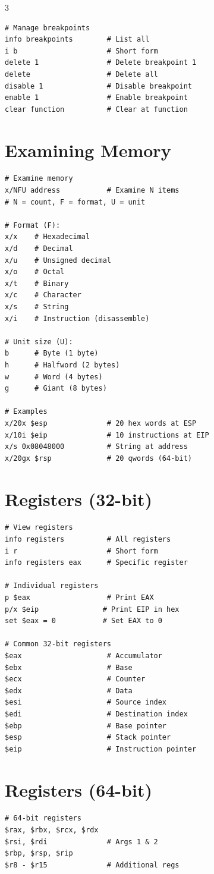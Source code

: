 \documentclass[10pt,landscape,a4paper]{article}
\begin{document}
\begin{multicols}{3}
\begin{lstlisting}
# Manage breakpoints
info breakpoints        # List all
i b                     # Short form
delete 1                # Delete breakpoint 1
delete                  # Delete all
disable 1               # Disable breakpoint
enable 1                # Enable breakpoint
clear function          # Clear at function
\end{lstlisting}

\section*{Examining Memory}
\begin{lstlisting}
# Examine memory
x/NFU address           # Examine N items
# N = count, F = format, U = unit

# Format (F):
x/x    # Hexadecimal
x/d    # Decimal
x/u    # Unsigned decimal
x/o    # Octal
x/t    # Binary
x/c    # Character
x/s    # String
x/i    # Instruction (disassemble)

# Unit size (U):
b      # Byte (1 byte)
h      # Halfword (2 bytes)
w      # Word (4 bytes)
g      # Giant (8 bytes)

# Examples
x/20x $esp              # 20 hex words at ESP
x/10i $eip              # 10 instructions at EIP
x/s 0x08048000          # String at address
x/20gx $rsp             # 20 qwords (64-bit)
\end{lstlisting}

\section*{Registers (32-bit)}
\begin{lstlisting}
# View registers
info registers          # All registers
i r                     # Short form
info registers eax      # Specific register

# Individual registers
p $eax                  # Print EAX
p/x $eip               # Print EIP in hex
set $eax = 0           # Set EAX to 0

# Common 32-bit registers
$eax                    # Accumulator
$ebx                    # Base
$ecx                    # Counter
$edx                    # Data
$esi                    # Source index
$edi                    # Destination index
$ebp                    # Base pointer
$esp                    # Stack pointer
$eip                    # Instruction pointer
\end{lstlisting}

\section*{Registers (64-bit)}
\begin{lstlisting}
# 64-bit registers
$rax, $rbx, $rcx, $rdx
$rsi, $rdi              # Args 1 & 2
$rbp, $rsp, $rip
$r8 - $r15              # Additional regs


\end{lstlisting}
\end{multicols}
\end{document}
